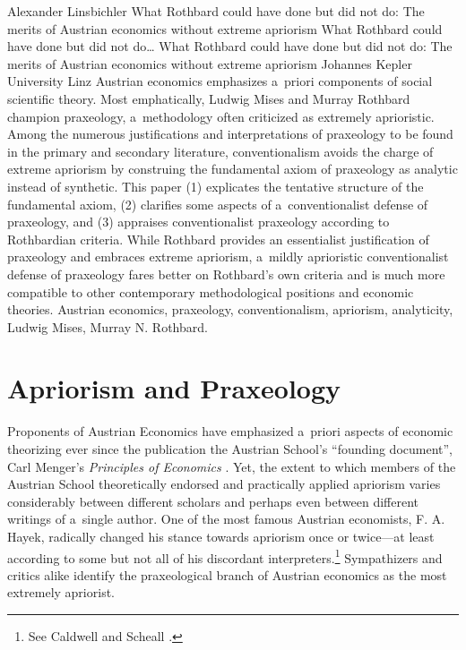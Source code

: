 \begin{artengenv}{Alexander Linsbichler}
	{What Rothbard could have done but did not do: The merits of Austrian economics without extreme apriorism}
	{What Rothbard could have done but did not do\ldots}
	{What Rothbard could have done but did not do: The merits of Austrian economics without extreme apriorism}
	{Johannes Kepler University Linz}
	{Austrian economics emphasizes a~priori components of social scientific theory. Most emphatically, Ludwig Mises and Murray Rothbard champion praxeology, a~methodology often criticized as extremely aprioristic. Among the numerous justifications and interpretations of praxeology to be found in the primary and secondary literature, conventionalism avoids the charge of extreme apriorism by construing the fundamental axiom of praxeology as analytic instead of synthetic. This paper (1) explicates the tentative structure of the fundamental axiom, (2) clarifies some aspects of a~conventionalist defense of praxeology, and (3) appraises conventionalist praxeology according to Rothbardian criteria. While Rothbard provides an essentialist justification of praxeology and embraces extreme apriorism, a~mildly aprioristic conventionalist defense of praxeology fares better on Rothbard's own criteria and is much more compatible to other contemporary methodological positions and economic theories.
	}
	{Austrian economics, praxeology, conventionalism, apriorism, analyticity, Ludwig Mises, Murray N. Rothbard.}







\section{Apriorism and Praxeology}

\lettrine[loversize=0.13,lines=2,lraise=-0.03,nindent=0em,findent=0.2pt]%
{P}{}roponents of Austrian Economics have emphasized a~priori aspects of economic theorizing ever since the publication the Austrian School's ``founding document'', Carl Menger's \textit{Principles of Economics} 
\parencite*[][]{menger_grundsatze_1871}. %
 Yet, the extent to which members of the Austrian School theoretically endorsed and practically applied apriorism varies considerably between different scholars and perhaps even between different writings of a~single author. One of the most famous Austrian economists, F. A. Hayek, radically changed his stance towards apriorism once or twice---at least according to some but not all of his discordant interpreters.\footnote{See Caldwell 
\parencite*[][]{caldwell_skirmish_2009} %
 and Scheall 
\parencite*[][]{scheall_hayek_2015}.%
} Sympathizers and critics alike identify the praxeological branch of Austrian economics as the most extremely apriorist.




\end{artengenv}

